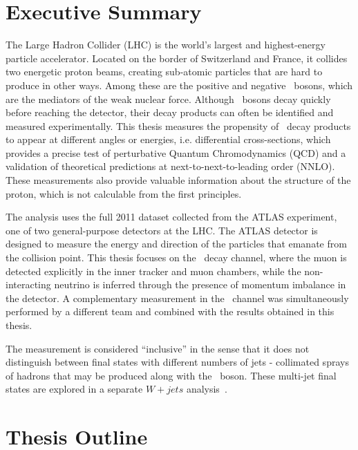
\section{Executive Summary}

The Large Hadron Collider (LHC) is the world's largest and highest-energy particle accelerator. Located on the border of Switzerland and France, it collides two energetic proton beams, creating sub-atomic particles that are hard to produce in other ways. Among these are the positive and negative \Wboson\ bosons, which are the mediators of the weak nuclear force. Although \Wboson\ bosons decay quickly before reaching the detector, their decay products can often be identified and measured experimentally. This thesis measures the propensity of \Wboson\ decay products to appear at different angles or energies, i.e. differential cross-sections, which provides a precise test of perturbative Quantum Chromodynamics (QCD) and a validation of theoretical predictions at next-to-next-to-leading order (NNLO). These measurements also provide valuable information about the structure of the proton, which is not calculable from the first principles.

The analysis uses the full 2011 dataset collected from the ATLAS experiment, one of two general-purpose detectors at the LHC. The ATLAS detector is designed to measure the energy and direction of the particles that emanate from the collision point. This thesis focuses on the \Wpmmn\ decay channel, where the muon is detected explicitly in the inner tracker and muon chambers, while the non-interacting neutrino is inferred through the presence of momentum imbalance in the detector. A complementary measurement in the \Wpmen\ channel was simultaneously performed by a different team and combined with the results obtained in this thesis.

The measurement is considered ``inclusive'' in the sense that it does not distinguish between final states with different numbers of jets - collimated sprays of hadrons that may be produced along with the \Wboson\ boson. These multi-jet final states are explored in a separate $W+jets$ analysis~\cite{Aad:2012en}.

\section{Thesis Outline}


